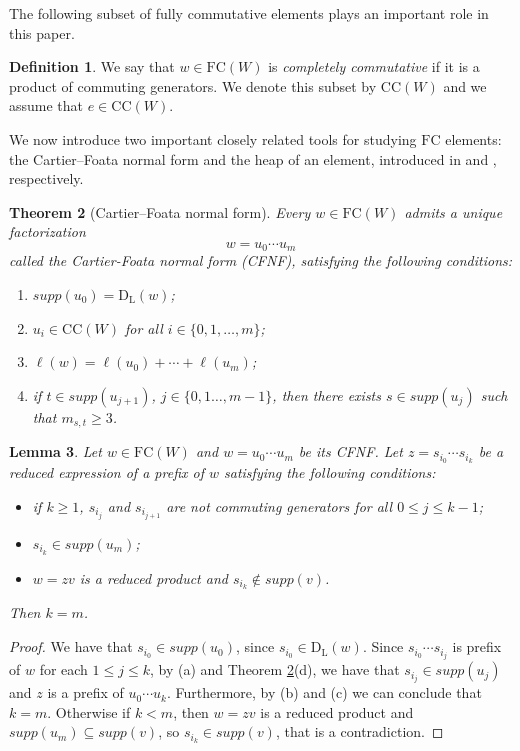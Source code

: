 \documentclass{amsart}
\newcommand{\ld}{{\mathrm{D}_{\mathrm{L}}}}
\newcommand{\fc}{{\mathrm{FC}}}
\newcommand{\TTC}{\mathrm{CC}}
\newtheorem{Theorem}{Theorem}[section]
\newtheorem{Lemma}[Theorem]{Lemma}
\theoremstyle{definition}
\newtheorem{Definition}[Theorem]{Definition}
\begin{document}
The following subset of fully commutative elements plays an important role in this paper.

\begin{Definition}
\label{comm}
We say that $w\in \fc(W)$ is \textit{completely commutative} if it is a product of commuting generators. We denote this subset by $\TTC(W)$ and we assume that $e\in \TTC(W)$. 
\end{Definition}

We now introduce two important closely related tools for studying $\fc$ elements: the Cartier–Foata normal form and the heap of an element, introduced in \cite{Fan} and \cite{viennot}, respectively. 

\begin{Theorem}[Cartier--Foata normal form]
\label{normalform}
Every $w\in \fc (W)$ admits a unique factorization   
\begin{equation} \label{CFNF}
w=u_0 \cdots u_m   
\end{equation}
called the \textit{Cartier-Foata normal form} (CFNF), satisfying the following conditions: 
\begin{enumerate}
    \item[(a)] $supp(u_0)=\ld(w)$; 
    \item[(b)] $u_i\in \TTC(W)$ for all $i\in \{0,1,\ldots, m\}$;
    \item[(c)] $\ell(w)=\ell(u_0)+\cdots +\ell(u_m)$;
    \item[(d)] if $t\in supp(u_{j+1})$, $j\in \{0,1\ldots, m-1\}$, then there exists $s\in  supp(u_j)$ such that $m_{s,t}\ge 3$.
\end{enumerate}
\end{Theorem}


\begin{Lemma}
\label{lemmaunitarissimo}
Let $w\in \fc(W)$ and $w=u_0 \cdots u_m$ be its CFNF. Let $z=s_{i_0}\cdots s_{i_k}$ be a reduced expression of a prefix of $w$ satisfying the following conditions: 
\begin{itemize}
    \item[(a)] if $k\ge1$, $s_{i_j}$ and $s_{i_{j+1}}$ are not commuting generators for all $0\le j\le k-1$;
    \item[(b)] $s_{i_k}\in supp(u_m)$;
    \item[(c)] $w=zv$ is a reduced product and $s_{i_k}\notin supp(v)$.
\end{itemize}
Then $k=m$. 
\end{Lemma}

\begin{proof}
We have that $s_{i_0}\in supp(u_0)$, since $s_{i_0}\in \ld(w)$. Since $s_{i_0}\cdots s_{i_j}$ is prefix of $w$ for each $1\le j\le k$, by (a) and Theorem \ref{normalform}(d), we have that $s_{i_j}\in supp(u_j)$ and $z$ is a prefix of $u_0\cdots u_k$. Furthermore, by (b) and (c) we can conclude that $k=m$. Otherwise if $k<m$, then $w=zv$ is a reduced product and $supp(u_m)\subseteq supp(v)$, so $s_{i_k}\in supp(v)$, that is a contradiction. 
\end{proof}
\end{document}
